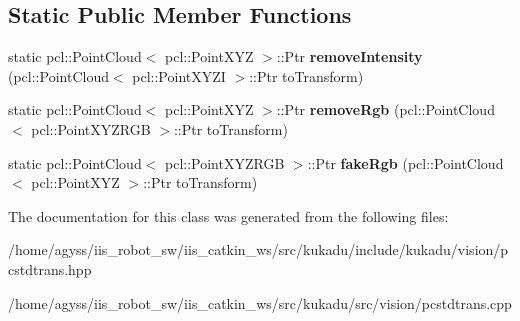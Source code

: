 \subsection*{Static Public Member Functions}
\begin{DoxyCompactItemize}
\item 
static pcl\+::\+Point\+Cloud$<$ pcl\+::\+Point\+X\+YZ $>$\+::Ptr {\bfseries remove\+Intensity} (pcl\+::\+Point\+Cloud$<$ pcl\+::\+Point\+X\+Y\+ZI $>$\+::Ptr to\+Transform)\hypertarget{classkukadu_1_1PCTransformator_aec33a492661e428643b680b3ea2455f0}{}\label{classkukadu_1_1PCTransformator_aec33a492661e428643b680b3ea2455f0}

\item 
static pcl\+::\+Point\+Cloud$<$ pcl\+::\+Point\+X\+YZ $>$\+::Ptr {\bfseries remove\+Rgb} (pcl\+::\+Point\+Cloud$<$ pcl\+::\+Point\+X\+Y\+Z\+R\+GB $>$\+::Ptr to\+Transform)\hypertarget{classkukadu_1_1PCTransformator_a0c533cd3559a1d2959ff315f0d2efc17}{}\label{classkukadu_1_1PCTransformator_a0c533cd3559a1d2959ff315f0d2efc17}

\item 
static pcl\+::\+Point\+Cloud$<$ pcl\+::\+Point\+X\+Y\+Z\+R\+GB $>$\+::Ptr {\bfseries fake\+Rgb} (pcl\+::\+Point\+Cloud$<$ pcl\+::\+Point\+X\+YZ $>$\+::Ptr to\+Transform)\hypertarget{classkukadu_1_1PCTransformator_a9e37df3d586aa7991c13f70394ca6ab8}{}\label{classkukadu_1_1PCTransformator_a9e37df3d586aa7991c13f70394ca6ab8}

\end{DoxyCompactItemize}


The documentation for this class was generated from the following files\+:\begin{DoxyCompactItemize}
\item 
/home/agyss/iis\+\_\+robot\+\_\+sw/iis\+\_\+catkin\+\_\+ws/src/kukadu/include/kukadu/vision/pcstdtrans.\+hpp\item 
/home/agyss/iis\+\_\+robot\+\_\+sw/iis\+\_\+catkin\+\_\+ws/src/kukadu/src/vision/pcstdtrans.\+cpp\end{DoxyCompactItemize}
